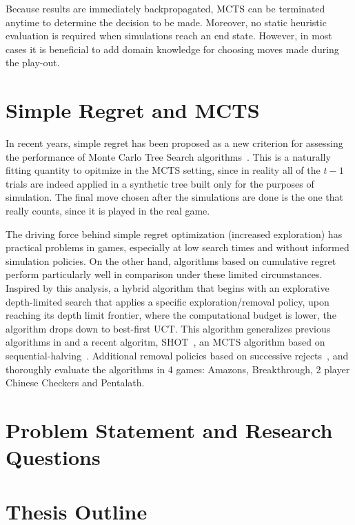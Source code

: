 \documentclass{kecsmstr}
\begin{document}
\begin{chaptercontents}
Because results are immediately backpropagated, MCTS can be terminated anytime to determine the decision to be made. Moreover, no static heuristic evaluation is required when simulations reach an end state. However, in most cases it is beneficial to add domain knowledge for choosing moves made during the play-out. 

\section{Simple Regret and MCTS}

In recent years, simple regret has been proposed as a new criterion for assessing the performance of Monte Carlo Tree Search algorithms~. This is a naturally fitting quantity to opitmize in the MCTS setting, since in reality all of the $t-1$ trials are indeed applied in a synthetic tree built only for the purposes of simulation. The final move chosen after the simulations are done is the one that really counts, since it is played in the real game.

The driving force behind simple regret optimization (increased exploration) has practical problems in games, especially at low search times and without informed simulation policies. On the other hand, algorithms based on cumulative regret perform particularly well in comparison under these limited circumstances. 
Inspired by this analysis, a hybrid algorithm that begins with an explorative depth-limited search that applies a specific exploration/removal policy, upon reaching its depth limit frontier, where the computational budget is lower, the algorithm drops down to best-first UCT. This algorithm generalizes previous algorithms in  and a recent algoritm, SHOT~, an MCTS algorithm based on sequential-halving~. Additional removal policies based on successive rejects~, and thoroughly evaluate the algorithms in 4 games: Amazons, Breakthrough, 2 player Chinese Checkers and Pentalath.

\section{Problem Statement and Research Questions}

\section{Thesis Outline}

\end{chaptercontents}
\end{document}
